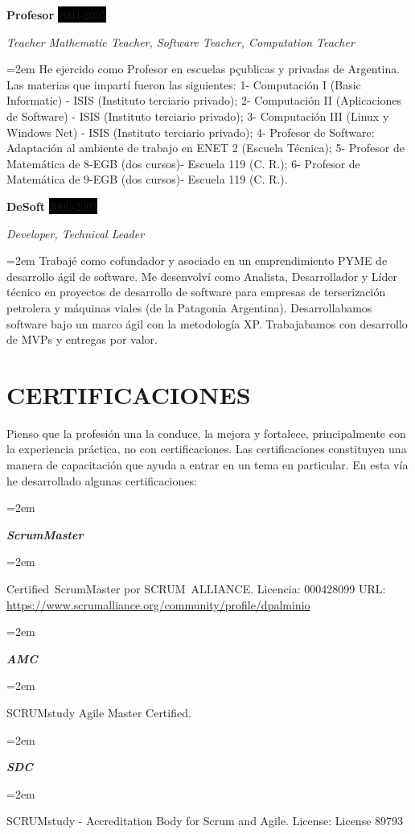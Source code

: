 \documentclass[paper=a4,fontsize=11pt]{scrartcl} %
\newlength{\spacebox}
\newcommand{\sepspace}{\vspace*{1em}}		%
\newcommand{\NewPart}[1]{\section*{\uppercase{#1}}}
\newcommand{\CertificatesEntry}[2]{      %
		\noindent\hangindent=2em\hangafter=0 %
		\parbox{\spacebox}{        %
		\textit{#1}}			   %
		\hspace{1.5em} #2 \par}    %
\newcommand{\EducationEntry}[4]{
		\noindent \textbf{#1} \hfill      %
		\colorbox{Black}{%
			\parbox{6em}{%
			\hfill\color{White}#2}} \par  %
		\noindent \textit{#3} \par        %
		\noindent\hangindent=2em\hangafter=0 \small #4 %
		\normalsize \par}
\newcommand{\WorkEntry}[4]{				  %
		\noindent \textbf{#1} \hfill      %
		\colorbox{Black}{\color{White}#2} \par  %
		\noindent \textit{#3} \par              %
		\noindent\hangindent=2em\hangafter=0 \small #4 %
		\normalsize \par}
\begin{document}
\sepspace

\WorkEntry{Profesor}{2004-2005}{Teacher Mathematic Teacher, Software Teacher, Computation Teacher}
{He ejercido como Profesor en escuelas pçublicas y privadas de Argentina. Las materias que impartí fueron las siguientes: 
1- Computación I (Basic Informatic) - ISIS (Instituto terciario privado); 
2- Computación II (Aplicaciones de Software) - ISIS (Instituto terciario privado); 
3- Computación III (Linux y Windows Net) - ISIS (Instituto terciario privado); 
4- Profesor de Software: Adaptación al ambiente de trabajo en ENET 2 (Escuela Técnica); 
5- Profesor de Matemática de 8-EGB  (dos cursos)- Escuela 119 (C. R.); 
6- Profesor de Matemática de 9-EGB (dos cursos)- Escuela 119 (C. R.).
}

\sepspace

\WorkEntry{DeSoft}{2000-2003}{Developer, Technical Leader}{
Trabajé como cofundador y asociado en un emprendimiento PYME de desarrollo ágil de software. Me desenvolví como Analista, Desarrollador y Líder técnico en proyectos de desarrollo de software para empresas de terserización petrolera y máquinas viales (de la Patagonia Argentina). Desarrollabamos software bajo un marco ágil con la metodología XP. Trabajabamos con desarrollo de MVPs y entregas por valor.}

\sepspace

\NewPart{Certificaciones}{}

Pienso que la profesión una la conduce, la mejora y fortalece, principalmente con la experiencia práctica, no con certificaciones. Las certificaciones constituyen una manera de capacitación que ayuda a entrar en un tema en particular. En esta vía he desarrollado algunas certificaciones:
\sepspace

\CertificatesEntry{\large{\textbf{ScrumMaster}}}{}
\CertificatesEntry{}{
Certified ScrumMaster por SCRUM ALLIANCE.\newline
Licencia: 000428099\newline
URL: \url{https://www.scrumalliance.org/community/profile/dpalminio}
}
\sepspace

\CertificatesEntry{\large{\textbf{AMC}}}{}
\CertificatesEntry{}{
SCRUMstudy Agile Master Certified.\newline
}
\sepspace

\CertificatesEntry{\large{\textbf{SDC}}}{}
\CertificatesEntry{}{
SCRUMstudy - Accreditation Body for Scrum and Agile.\newline
License: License 89793\newline
}
\sepspace
\end{document}
